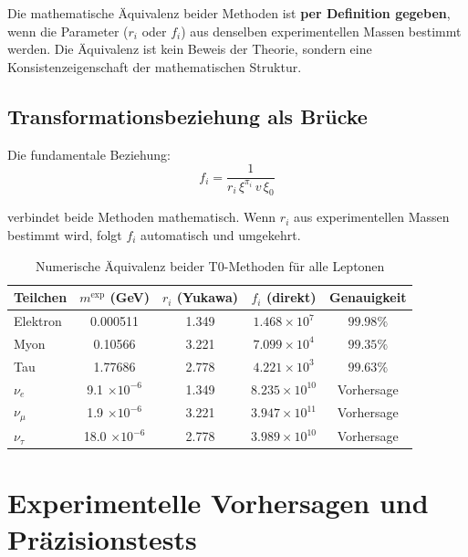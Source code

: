 \begin{keypoint}
	Die mathematische Äquivalenz beider Methoden ist \textbf{per Definition gegeben}, wenn die Parameter ($r_i$ oder $f_i$) aus denselben experimentellen Massen bestimmt werden. Die Äquivalenz ist kein Beweis der Theorie, sondern eine Konsistenzeigenschaft der mathematischen Struktur.
\end{keypoint}

\subsection{Transformationsbeziehung als Brücke}
\label{subsec:transformation_relationship}

Die fundamentale Beziehung:
\begin{equation}
	f_i = \frac{1}{r_i \, \xi^{\pi_i} \, v \, \xi_0}
	\label{eq:transformation_bridge}
\end{equation}

verbindet beide Methoden mathematisch. Wenn $r_i$ aus experimentellen Massen bestimmt wird, folgt $f_i$ automatisch und umgekehrt.

\begin{table}[H]
	\centering
	\begin{tabular}{lcccc}
		\toprule
		\textbf{Teilchen} & \textbf{$m^{\text{exp}}$ (GeV)} & \textbf{$r_i$ (Yukawa)} & \textbf{$f_i$ (direkt)} & \textbf{Genauigkeit} \\
		\midrule
		Elektron & 0.000511 & 1.349 & $1.468 \times 10^{7}$ & $99.98\%$ \\
		Myon & 0.10566 & 3.221 & $7.099 \times 10^{4}$ & $99.35\%$ \\
		Tau & 1.77686 & 2.778 & $4.221 \times 10^{3}$ & $99.63\%$ \\
		\midrule
		$\nu_e$ & 9.1 $\times 10^{-6}$ & 1.349 & $8.235 \times 10^{10}$ & Vorhersage \\
		$\nu_\mu$ & 1.9 $\times 10^{-6}$ & 3.221 & $3.947 \times 10^{11}$ & Vorhersage \\
		$\nu_\tau$ & 18.0 $\times 10^{-6}$ & 2.778 & $3.989 \times 10^{10}$ & Vorhersage \\
		\bottomrule
	\end{tabular}
	\caption{Numerische Äquivalenz beider T0-Methoden für alle Leptonen}
	\label{tab:numerical_equivalence_complete}
\end{table}

\section{Experimentelle Vorhersagen und Präzisionstests}
\label{sec:experimental_predictions}

